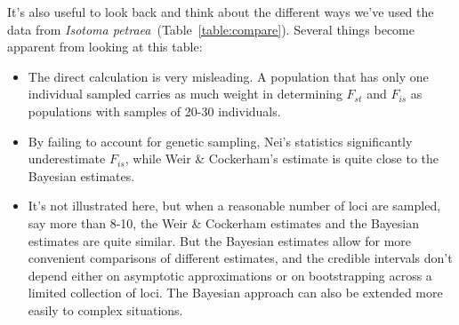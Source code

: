 It's also useful to look back and think about the different ways
we've used the data from {\it Isotoma
  petraea}~(Table~\ref{table:compare}). Several things become apparent
from looking at this table:

\begin{itemize}

\item The direct calculation is very misleading. A population that
  has only one individual sampled carries as much weight in
  determining $F_{st}$ and $F_{is}$ as populations with samples of
  20-30 individuals.

\item By failing to account for genetic sampling, Nei's statistics
  significantly underestimate $F_{is}$, while Weir \& Cockerham's
  estimate is quite close to the Bayesian estimates.

\item It's not illustrated here, but when a reasonable number of loci
  are sampled, say more than 8-10, the Weir \& Cockerham estimates and
  the Bayesian estimates are quite similar. But the Bayesian estimates
  allow for more convenient comparisons of different estimates, and
  the credible intervals don't depend either on asymptotic
  approximations or on bootstrapping across a limited collection of
  loci. The Bayesian approach can also be extended more easily to
  complex situations.

\end{itemize}

